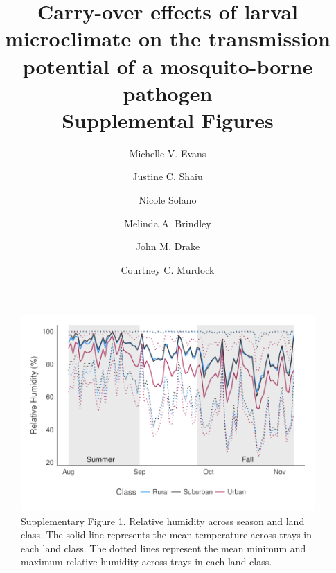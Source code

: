 \documentclass[12pt]{article}
\begin{document}
\title{Carry-over effects of larval microclimate on the transmission potential of a mosquito-borne pathogen\\
\large Supplemental Figures}
\author{
		Michelle V. Evans\\
		\and
		Justine C. Shaiu\\
		\and
		Nicole Solano\\
		\and
		Melinda A. Brindley\\
		\and
		John M. Drake\\
    \and
    Courtney C. Murdock
		}
\date{}
\maketitle

\newpage
\begin{figure}
\centering\includegraphics[width=0.9\linewidth]{relativeHumiditySupp1.pdf}
\caption{Supplementary Figure 1. Relative humidity across season and land class. The solid line represents the mean temperature across trays in each land class. The dotted lines represent the mean minimum and maximum relative humidity across trays in each land class.}
\end{figure}
\end{document}
